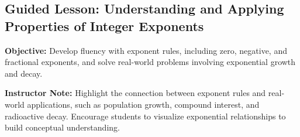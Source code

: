 \documentclass[12pt]{article}
\title{}
\date{}
\begin{document}
\subsection*{Guided Lesson: Understanding and Applying Properties of Integer Exponents}
\onehalfspacing

\begin{tcolorbox}[colframe=black!40, colback=gray!5, 
coltitle=black, colbacktitle=black!20, fonttitle=\bfseries\Large, 
title=Learning Objective, halign title=center, left=5pt, right=5pt, top=5pt, bottom=15pt]
\textbf{Objective:} Develop fluency with exponent rules, including zero, negative, and fractional exponents, and solve real-world problems involving exponential growth and decay.

{\color{blue} \textbf{Instructor Note:} Highlight the connection between exponent rules and real-world applications, such as population growth, compound interest, and radioactive decay. Encourage students to visualize exponential relationships to build conceptual understanding.}
\end{tcolorbox}

\vspace{1em}
\end{document}
